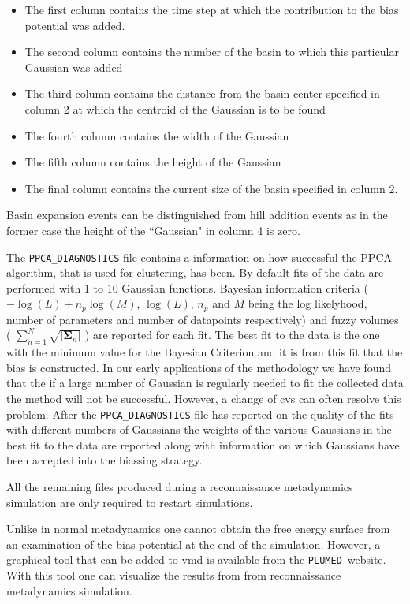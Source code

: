 \documentclass[12pt,fleqn]{report}
\newcommand{\plumed}{{\tt PLUMED}}
\begin{document}
\begin{itemize}
\item{The first column contains the time step at which the contribution to the bias potential was added.}
\item{The second column contains the number of the basin to which this particular Gaussian was added}
\item{The third column contains the distance from the basin center specified in column 2 at which the centroid of the Gaussian is to be found}
\item{The fourth column contains the width of the Gaussian}
\item{The fifth column contains the height of the Gaussian}
\item{The final column contains the current size of the basin specified in column 2.}
\end{itemize}

Basin expansion events can be distinguished from hill addition events as in the former case the height of the ``Gaussian" in column 4 is zero.

The {\tt PPCA\_DIAGNOSTICS} file contains a information on how successful the PPCA algorithm, that is used for clustering, has been.  By default fits of the data are performed with 1 to 10 Gaussian functions.  Bayesian information criteria ( $-\log(L) + n_p \log(M)$, $\log(L)$, $n_p$ and $M$ being the log likelyhood, number of parameters and number of datapoints respectively) and fuzzy volumes ( $\sum_{n=1}^{N} \sqrt{ | \mathbf{\Sigma}_n | }$ ) are reported for each fit.  The best fit to the data is the one with the minimum value for the Bayesian Criterion and it is from this fit that the bias is constructed.  In our early applications of the methodology we have found that the if a large number of Gaussian is regularly needed to fit the collected data the method will not be successful.  However, a change of cvs can often resolve this problem.  After the {\tt PPCA\_DIAGNOSTICS} file has reported on the quality of the fits with different numbers of Gaussians the weights of the various Gaussians in the best fit to the data are reported along with information on which Gaussians have been accepted into the biassing strategy.

All the remaining files produced during a reconnaissance metadynamics simulation are only required to restart simulations.    
    
Unlike in normal metadynamics one cannot obtain the free energy surface from an examination of the bias potential at the end of the simulation.  However, a graphical tool that can be added to vmd is available from the \plumed\ website.  With this tool one can visualize the results from from reconnaissance metadynamics simulation.
\end{document}
